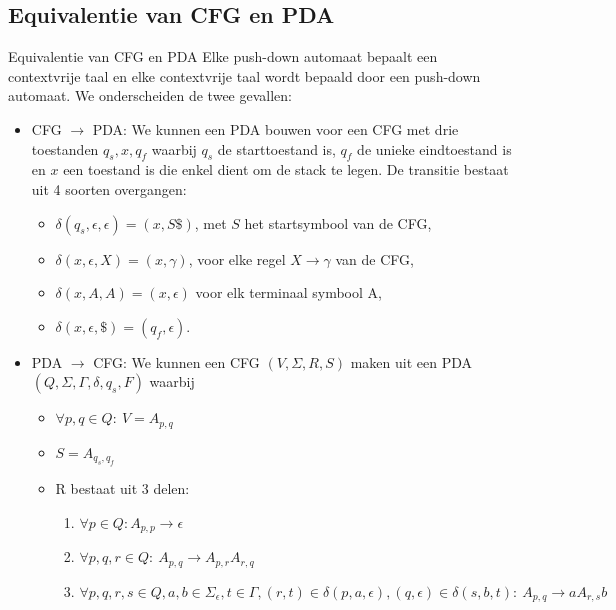 \subsection{Equivalentie van CFG en PDA}

\vspace{0.5cm}

\begin{lem}{Equivalentie van CFG en PDA}
    Elke push-down automaat bepaalt een contextvrije taal en elke contextvrije taal wordt bepaald door een push-down automaat. We onderscheiden de twee gevallen:
    \begin{itemize}
        \item CFG $\to$ PDA: 
        We kunnen een PDA bouwen voor een CFG met drie toestanden $q_s,x,q_f$ waarbij $q_s$ de starttoestand is, $q_f$ de unieke eindtoestand is en $x$ een toestand is die enkel dient om de stack te legen. De transitie bestaat uit 4 soorten overgangen:
        \begin{itemize}
            \item $\delta(q_s, \epsilon, \epsilon) = (x, S\$)$, met $S$ het startsymbool van de CFG,
            \item $\delta(x, \epsilon, X) = (x, \gamma)$, voor elke regel $X \to \gamma$ van de CFG, 
            \item $\delta(x,A,A) = (x, \epsilon)$ voor elk terminaal symbool A,
            \item $\delta(x, \epsilon, \$) = (q_f, \epsilon)$.
        \end{itemize}
        \item PDA $\to$ CFG: 
        We kunnen een CFG $(V, \Sigma, R, S)$ maken uit een PDA $(Q,\Sigma,\Gamma,\delta,q_s,F)$ waarbij
        \begin{itemize}
            \item $\forall p,q \in Q: \ V = A_{p,q}$
            \item $S = A_{q_s,q_f}$
            \item 
                R bestaat uit 3 delen:
                \begin{enumerate}
                    \item $\forall p \in Q: A_{p,p} \to \epsilon$
                    \item $\forall p,q,r \in Q: \ A_{p,q} \to A_{p,r}A_{r,q}$
                    \item $\forall p,q,r,s \in Q, a,b \in \Sigma_{\epsilon}, t \in \Gamma, (r,t) \in \delta(p,a,\epsilon),(q,\epsilon) \in \delta(s,b,t): \ A_{p,q} \to aA_{r,s}b$
                \end{enumerate}
        \end{itemize}
    \end{itemize}
    \vspace{-0.2cm}
\end{lem}

